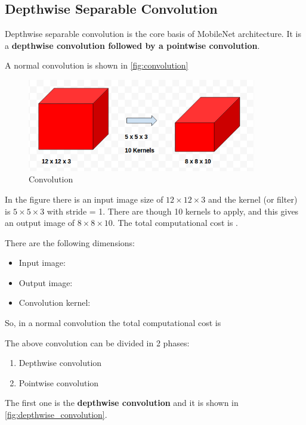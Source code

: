 \subsection{Depthwise Separable Convolution}
Depthwise separable convolution is the core basis of MobileNet architecture. It
is a \textbf{depthwise convolution followed by a pointwise convolution}.

A normal convolution is shown in \autoref{fig:convolution}

\begin{figure}[ht]
    \includegraphics[width=10cm]{images/experiments/convolution.png}
    \centering
    \caption{Convolution}\label{fig:convolution}
\end{figure}

In the figure there is an input image size of $12\times12\times3$ and the
kernel (or filter) is $5\times5\times3$ with stride = 1. There are though 10
kernels to apply, and this gives an output image of $8\times8\times10$.
The total computational cost is .

There are the following dimensions:
\begin{itemize}
    \item Input image: 
    \item Output image: 
    \item Convolution kernel: 
\end{itemize}

So, in a normal convolution the total computational cost is

The above convolution can be divided  in 2 phases:
\begin{enumerate}
    \item Depthwise convolution
    \item Pointwise convolution
\end{enumerate}

The first one is the \textbf{depthwise convolution} and it is shown in
\autoref{fig:depthwise_convolution}.

